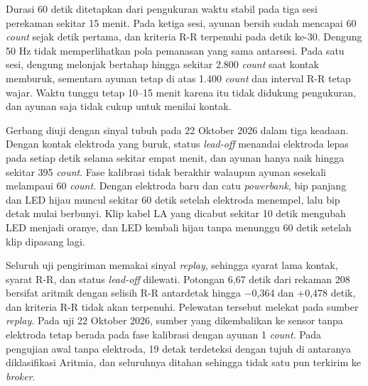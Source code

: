 Durasi 60 detik ditetapkan dari pengukuran waktu stabil pada tiga sesi perekaman sekitar 15 menit. Pada ketiga sesi, ayunan bersih sudah mencapai 60 \textit{count} sejak detik pertama, dan kriteria R-R terpenuhi pada detik ke-30. Dengung 50 Hz tidak memperlihatkan pola pemanasan yang sama antarsesi. Pada satu sesi, dengung melonjak bertahap hingga sekitar 2.800 \textit{count} saat kontak memburuk, sementara ayunan tetap di atas 1.400 \textit{count} dan interval R-R tetap wajar. Waktu tunggu tetap 10--15 menit karena itu tidak didukung pengukuran, dan ayunan saja tidak cukup untuk menilai kontak.

Gerbang diuji dengan sinyal tubuh pada 22 Oktober 2026 dalam tiga keadaan. Dengan kontak elektroda yang buruk, status \textit{lead-off} menandai elektroda lepas pada setiap detik selama sekitar empat menit, dan ayunan hanya naik hingga sekitar 395 \textit{count}. Fase kalibrasi tidak berakhir walaupun ayunan sesekali melampaui 60 \textit{count}. Dengan elektroda baru dan catu \textit{powerbank}, bip panjang dan LED hijau muncul sekitar 60 detik setelah elektroda menempel, lalu bip detak mulai berbunyi. Klip kabel LA yang dicabut sekitar 10 detik mengubah LED menjadi oranye, dan LED kembali hijau tanpa menunggu 60 detik setelah klip dipasang lagi.

Seluruh uji pengiriman memakai sinyal \textit{replay}, sehingga syarat lama kontak, syarat R-R, dan status \textit{lead-off} dilewati. Potongan 6,67 detik dari rekaman 208 bersifat aritmik dengan selisih R-R antardetak hingga $-$0,364 dan $+$0,478 detik, dan kriteria R-R tidak akan terpenuhi. Pelewatan tersebut melekat pada sumber \textit{replay}. Pada uji 22 Oktober 2026, sumber yang dikembalikan ke sensor tanpa elektroda tetap berada pada fase kalibrasi dengan ayunan 1 \textit{count}. Pada pengujian awal tanpa elektroda, 19 detak terdeteksi dengan tujuh di antaranya diklasifikasi Aritmia, dan seluruhnya ditahan sehingga tidak satu pun terkirim ke \textit{broker}.

